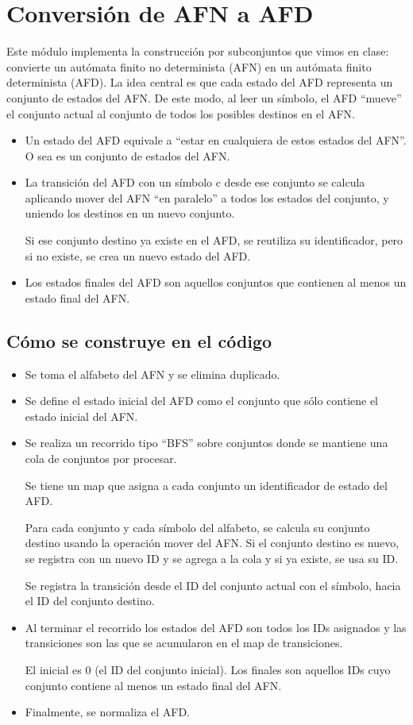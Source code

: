 
\section{Conversión de AFN a AFD}

Este módulo implementa la construcción por subconjuntos que vimos en clase: convierte un autómata finito no determinista (AFN) en un autómata finito determinista (AFD). La idea central es que cada estado del AFD representa un conjunto de estados del AFN. De este modo, al leer un símbolo, el AFD “mueve” el conjunto actual al conjunto de todos los posibles destinos en el AFN.

\begin{itemize}
    \item Un estado del AFD equivale a “estar en cualquiera de estos estados del AFN”. O sea es un conjunto de estados del AFN.
    \item La transición del AFD con un símbolo c desde ese conjunto se calcula aplicando mover del AFN “en paralelo” a todos los estados del conjunto, y uniendo los destinos en un nuevo conjunto.
    
    Si ese conjunto destino ya existe en el AFD, se reutiliza su identificador, pero si no existe, se crea un nuevo estado del AFD.
    \item Los estados finales del AFD son aquellos conjuntos que contienen al menos un estado final del AFN.
\end{itemize}

\subsection{Cómo se construye en el código}
\begin{itemize}
    \item Se toma el alfabeto del AFN y se elimina duplicado.
    \item Se define el estado inicial del AFD como el conjunto que sólo contiene el estado inicial del AFN.
    \item Se realiza un recorrido tipo “BFS” sobre conjuntos donde se mantiene una cola de conjuntos por procesar.
    
    Se tiene un map que asigna a cada conjunto un identificador de estado del AFD.
    
    Para cada conjunto y cada símbolo del alfabeto, se calcula su conjunto destino usando la operación mover del AFN. Si el conjunto destino es nuevo, se registra con un nuevo ID y se agrega a la cola y si ya existe, se usa su ID.

    Se registra la transición desde el ID del conjunto actual con el símbolo, hacia el ID del conjunto destino.
    \item Al terminar el recorrido los estados del AFD son todos los IDs asignados y las transiciones son las que se acumularon en el map de transiciones.
    
    El inicial es 0 (el ID del conjunto inicial).
    Los finales son aquellos IDs cuyo conjunto contiene al menos un estado final del AFN.

    \item Finalmente, se normaliza el AFD.
\end{itemize}